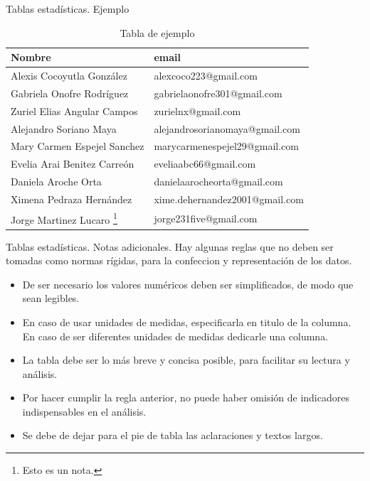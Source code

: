 \documentclass[11pt]{beamer}
\begin{document}
      \begin{frame}{Tablas estadísticas. Ejemplo}
        \begin{table}[h!]
          \centering
          \begin{tabular}{|l|l|}
            \hline
            Nombre & email \\
            \hline
            Alexis Cocoyutla González     & alexcoco223@gmail.com \\
            \hline
            Gabriela Onofre Rodríguez     & gabrielaonofre301@gmail.com \\
            \hline
            Zuriel Elias Angular Campos   & zurielnx@gmail.com \\
            \hline
            Alejandro Soriano Maya        & alejandrosorianomaya@gmail.com \\
            \hline
            Mary Carmen Espejel Sanchez   & marycarmenespejel29@gmail.com \\
            \hline
            Evelia Arai Benitez Carre\'on & eveliaabc66@gmail.com \\
            \hline
            Daniela Aroche Orta           & danielaarocheorta@gmail.com \\
            \hline
            Ximena Pedraza Hern\'andez    & xime.dehernandez2001@gmail.com \\
            \hline
            Jorge Martinez Lucaro  \footnote{Esto es un nota.}        & jorge231five@gmail.com \\
            \hline
          \end{tabular}
          \caption{Tabla de ejemplo}
        \end{table}
      \end{frame}



      \begin{frame}{Tablas estadísticas. Notas adicionales.}
        Hay algunas reglas que no deben ser tomadas como normas rígidas, para la confeccion y representación de los datos.

        \begin{itemize}
          \item De ser necesario los valores numéricos deben ser simplificados, de modo que sean legibles.
          \item En caso de usar unidades de medidas, especificarla en titulo de la columna. En caso de ser diferentes unidades de medidas dedicarle una columna.
          \item La tabla debe ser lo más breve y concisa posible, para facilitar su lectura y análisis.
          \item Por hacer cumplir la regla anterior, no puede haber omisión de indicadores indispensables en el análisis.
          \item Se debe de dejar para el pie de tabla las aclaraciones y textos largos.

        \end{itemize}
      \end{frame}
\end{document}
